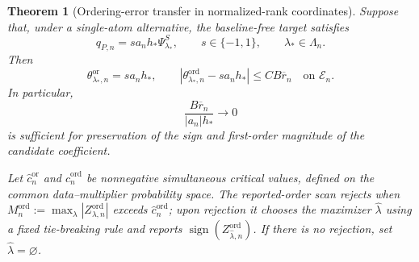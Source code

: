 \documentclass[11pt]{article}
\newtheorem{theorem}{Theorem}[section]
\theoremstyle{definition}
\newcommand{\1}{\mathbf 1}\newcommand{\op}{\operatorname}
\begin{document}
\begin{theorem}[Ordering-error transfer in normalized-rank coordinates]
Suppose that, under a single-atom alternative, the baseline-free
target satisfies
\begin{equation}
 q_{P,n}=s a_nh_*\Psi_{\lambda_*}^S,\qquad
 s\in\{-1,1\},\qquad \lambda_*\in\Lambda_n.
 \label{eq:T4-single-atom}
\end{equation}
Then
\begin{equation}
 \theta_{\lambda_*,n}^{\mathrm{or}}=s a_nh_*,
 \qquad
 |\theta_{\lambda_*,n}^{\mathrm{ord}}-s a_nh_*|
 \le CB\overline r_n
 \quad\text{on }\mathcal E_n.
 \label{eq:T4-signal-coefficient}
\end{equation}
In particular,
\begin{equation}
 \frac{B\overline r_n}{|a_n|h_*}\to0
 \label{eq:T4-beta-min}
\end{equation}
is sufficient for preservation of the sign and first-order magnitude
of the candidate coefficient.

Let $\widehat c_n^{\mathrm{or}}$ and
$\widehat c_n^{\mathrm{ord}}$ be nonnegative simultaneous critical
values, defined on the common data--multiplier probability space. The
reported-order scan rejects when
$M_n^{\mathrm{ord}}:=\max_\lambda|Z_{\lambda,n}^{\mathrm{ord}}|$
exceeds $\widehat c_n^{\mathrm{ord}}$; upon rejection it chooses the
maximizer $\widehat\lambda$ using a fixed tie-breaking rule and
reports $\operatorname{sign}(Z_{\widehat\lambda,n}^{\mathrm{ord}})$.
If there is no rejection, set $\widehat\lambda=\varnothing$.


\end{theorem}
\end{document}
